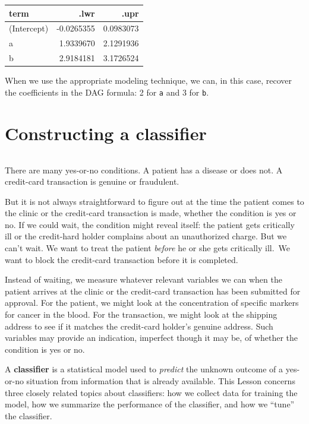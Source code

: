 \documentclass[
  letterpaper,
  DIV=11,
  numbers=noendperiod,
  oneside]{scrreprt}
\newcommand{\Ptest}{\mathbb{P}}
\newcommand{\Ntest}{\mathbb{N}}
\newcommand{\given}{\ |\!\!|\  }
\begin{document}
{\begin{footnotesize}
\ttfamily 
\begin{tabular}{lrr}
\toprule
term & .lwr & .upr\\
\midrule
(Intercept) & -0.0265355 & 0.0983073\\
a & 1.9339670 & 2.1291936\\
b & 2.9184181 & 3.1726524\\
\bottomrule
\end{tabular} \normalfont
\bigskip

When we use the appropriate modeling technique, we can, in this case,
recover the coefficients in the DAG formula: 2 for \texttt{a} and 3 for
\texttt{b}.

\end{footnotesize}}

\hypertarget{sec-lesson-34}{%
\chapter{Constructing a classifier}\label{sec-lesson-34}}

\[\newcommand{\Ptest}{\mathbb{P}}
\newcommand{\Ntest}{\mathbb{N}}
\newcommand{\given}{\ |\!\!|\  }\]

There are many yes-or-no conditions. A patient has a disease or does
not. A credit-card transaction is genuine or fraudulent.

But it is not always straightforward to figure out at the time the
patient comes to the clinic or the credit-card transaction is made,
whether the condition is yes or no. If we could wait, the condition
might reveal itself: the patient gets critically ill or the credit-hard
holder complains about an unauthorized charge. But we can't wait. We
want to treat the patient \emph{before} he or she gets critically
ill.~We want to block the credit-card transaction before it is
completed.

Instead of waiting, we measure whatever relevant variables we can when
the patient arrives at the clinic or the credit-card transaction has
been submitted for approval. For the patient, we might look at the
concentration of specific markers for cancer in the blood. For the
transaction, we might look at the shipping address to see if it matches
the credit-card holder's genuine address. Such variables may provide an
indication, imperfect though it may be, of whether the condition is yes
or no.

A \textbf{classifier} is a statistical model used to \emph{predict} the
unknown outcome of a yes-or-no situation from information that is
already available. This Lesson concerns three closely related topics
about classifiers: how we collect data for training the model, how we
summarize the performance of the classifier, and how we ``tune'' the
classifier.
\end{document}

